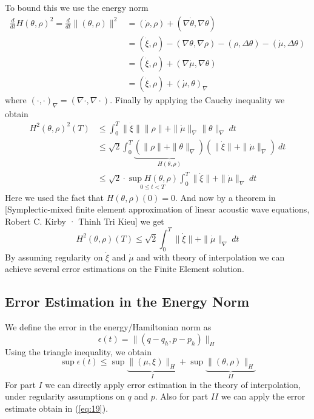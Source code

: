 \documentclass[12pt]{article}
\begin{document}
To bound this we use the energy norm
\begin{equation} \label{eq:17}
\begin{aligned}
	\frac d {dt} H(\theta , \rho)^2 = \frac d {dt} \| (\theta,\rho) \|^2 &= (\dot \rho,\rho) + (\nabla \dot \theta,\nabla \theta) \\
	&= (\dot \xi,\rho) - (\nabla \theta , \nabla \rho) - (\rho , \Delta \theta) - (\dot \mu , \Delta \theta) \\
	&= (\dot \xi, \rho) + (\nabla \dot \mu , \nabla \theta) \\
	&= (\dot \xi, \rho) + (\dot \mu, \theta)_{\nabla}
\end{aligned}
\end{equation}
where $(\cdot,\cdot)_{\nabla} = (\nabla \cdot,\nabla \cdot)$. Finally by applying the Cauchy inequality we obtain
\begin{equation} \label{eq:18}
\begin{aligned}
	H^2(\theta,\rho)^2(T) &\leq \int_0^T \| \dot \xi \| \| \rho \| + \| \dot \mu\|_{\nabla} \|\theta \|_\nabla \ dt \\
	& \leq \sqrt{2} \int_0^T \underbrace{( \| \rho \| + \|\theta \|_\nabla )}_{H(\theta,\rho)} ( \| \dot \xi \| + \| \dot \mu\|_{\nabla} ) \ dt \\
	& \leq \sqrt{2}\cdot \underset{0\leq t < T}{\sup H(\theta,\rho)} \int_0^T \| \dot \xi \| + \| \dot \mu\|_{\nabla}  \ dt
\end{aligned}
\end{equation}
Here we used the fact that $H(\theta,\rho)(0) = 0 $. And now by a theorem in [Symplectic-mixed finite element approximation of linear acoustic wave equations, Robert C. Kirby · Thinh Tri Kieu] we get
\begin{equation} \label{eq:19}
	H^2(\theta,\rho)(T) \leq \sqrt 2 \int_0^T \| \dot \xi \| + \| \dot \mu\|_{\nabla}  \ dt
\end{equation}
By assuming regularity on $\dot \xi$ and $\dot \mu$ and with theory of interpolation we can achieve several error estimations on the Finite Element solution.

\subsection{Error Estimation in the Energy Norm}
We define the error in the energy/Hamiltonian norm as
\begin{equation} \label{eq:20}
	\epsilon(t) = \| (q-q_h,p-p_h) \|_H
\end{equation}
Using the triangle inequality, we obtain
\begin{equation} \label{eq:21}
	\sup \epsilon(t) \leq \sup \underbrace{ \| (\mu, \xi) \|_H }_{I} + \sup \underbrace{ \| (\theta, \rho) \|_H }_{II}
\end{equation}
For part $I$ we can directly apply error estimation in the theory of interpolation, under regularity assumptions on $q$ and $p$. Also for part $II$ we can apply the error estimate obtain in (\ref{eq:19}).
\end{document}
